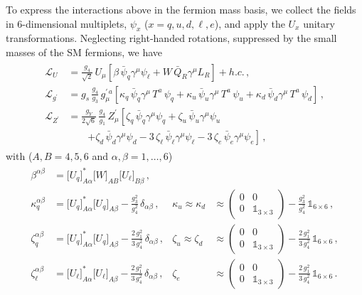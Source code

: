 To express the interactions above in the fermion mass basis, we collect the fields in 6-dimensional multiplets, $\psi_x$ ($x=q,u,d,\ell,e$), and apply the $U_x$ unitary transformations. Neglecting right-handed rotations, suppressed by the small masses of the SM fermions, we have
\begin{align}
\begin{aligned}
\mathcal{L}_U&=\frac{g_4}{\sqrt{2}}\,U_\mu\left[\beta\,\bar \psi_q\gamma^\mu \psi_\ell+W\,\bar Q_R\gamma^\mu L_R\right]+h.c.\,,\\
\mathcal{L}_{g^\prime}&= g_s\,\frac{g_4}{g_3}\,g^{\prime\,a}_\mu\left[\kappa_q\,\bar \psi_q\gamma^\mu\,T^a\, \psi_q+\kappa_u\,\bar \psi_u\gamma^\mu\,T^a\, \psi_u+\kappa_d\,\bar \psi_d\gamma^\mu\,T^a\, \psi_d\right]\,,\\
\mathcal{L}_{Z^\prime}&=\frac{g_Y}{2\sqrt{6}}\,\frac{g_4}{g_1}\,Z_\mu^\prime\left[\zeta_q\,\bar \psi_q\gamma^\mu \psi_q+\zeta_u\,\bar \psi_u\gamma^\mu \psi_u
\right.
\\&\qquad
\left.
+\zeta_d\,\bar \psi_d\gamma^\mu \psi_d-3\,\zeta_\ell\,\bar \psi_\ell\gamma^\mu \psi_\ell-3\,\zeta_e\,\bar \psi_e\gamma^\mu \psi_e\right]\,,\label{eq:LLmbS}
\end{aligned}
\end{align}
with ($A,B=4,5,6$ and $\alpha,\beta=1,\dots,6$)
\begin{align}
\begin{aligned}
\beta^{\alpha\beta}&= \big[U_q\big]^*_{A\alpha}\big[W\big]_{AB} \big[U_\ell\big]_{B\beta}\,,\\
\kappa_q^{\alpha\beta}&= \big[U_q\big]^*_{A\alpha} \big[U_q\big]_{A\beta}-\frac{g_3^2}{g_4^2}\,\delta_{\alpha\beta}\,,&\kappa_u\approx\kappa_d&\approx
\begin{pmatrix}
0 & 0\\
0 & \mathbb{1}_{3\times3}
\end{pmatrix}
-\frac{g_3^2}{g_4^2}\,\mathbb{1}_{6\times6}\,,\\
\zeta_q^{\alpha\beta}&= \big[U_q\big]^*_{A\alpha} \big[U_q\big]_{A\beta}-\frac{2\,g_1^2}{3\,g_4^2}\,\delta_{\alpha\beta}\,,& \zeta_u\approx\zeta_d&\approx
\begin{pmatrix}
0 & 0\\
0 & \mathbb{1}_{3\times3}
\end{pmatrix}
-\frac{2\,g_1^2}{3\,g_4^2}\,\mathbb{1}_{6\times6}\,,\\
\zeta_\ell^{\alpha\beta}&= \big[U_\ell\big]^*_{A\alpha} \big[U_\ell\big]_{A\beta}-\frac{2\,g_1^2}{3\,g_4^2}\,\delta_{\alpha\beta}\,,& \zeta_e&\approx
\begin{pmatrix}
0 & 0\\
0 & \mathbb{1}_{3\times3}
\end{pmatrix}
-\frac{2\,g_1^2}{3\,g_4^2}\,\mathbb{1}_{6\times6}\,.
\end{aligned}
\end{align}
